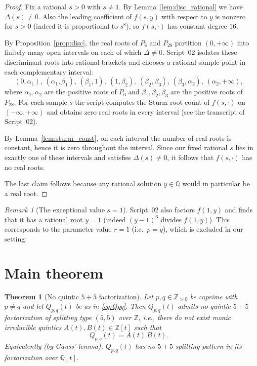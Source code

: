 \documentclass[12pt]{article}
\newtheorem{theorem}{Theorem}
\theoremstyle{remark}
\newtheorem{remark}{Remark}
\theoremstyle{definition}
\begin{document}
\begin{proof}
Fix a rational \(s>0\) with \(s\neq 1\).
By Lemma~\ref{lem:disc_rational} we have \(\Delta(s)\neq 0\).
Also the leading coefficient of \(f(s,y)\) with respect to \(y\) is nonzero for \(s>0\) (indeed it is proportional to \(s^8\)), so \(f(s,\cdot)\) has constant degree \(16\).

By Proposition~\ref{prop:disc}, the real roots of \(P_6\) and \(P_{28}\) partition \((0,+\infty)\) into finitely many open intervals on each of which \(\Delta\neq 0\).
Script~02 isolates these discriminant roots into rational brackets and chooses a rational sample point in each complementary interval:
\[
(0,\alpha_1),\ (\alpha_1,\beta_1),\ (\beta_1,1),\ (1,\beta_2),\ (\beta_2,\beta_3),\ (\beta_3,\alpha_2),\ (\alpha_2,+\infty),
\]
where \(\alpha_1,\alpha_2\) are the positive roots of \(P_6\) and \(\beta_1,\beta_2,\beta_3\) are the positive roots of \(P_{28}\).
For each sample \(s\) the script computes the Sturm root count of \(f(s,\cdot)\) on \((-\infty,+\infty)\) and obtains zero real roots in every interval (see the transcript of Script~02).

By Lemma~\ref{lem:sturm_const}, on each interval the number of real roots is constant, hence it is zero throughout the interval.
Since our fixed rational \(s\) lies in exactly one of these intervals and satisfies \(\Delta(s)\neq 0\), it follows that \(f(s,\cdot)\) has no real roots.

The last claim follows because any rational solution \(y\in\mathbb{Q}\) would in particular be a real root.
\end{proof}

\begin{remark}[The exceptional value $s=1$]
Script~02 also factors $f(1,y)$ and finds that it has a rational root $y=1$ (indeed $(y-1)^6$ divides $f(1,y)$).
This corresponds to the parameter value $r=1$ (i.e.\ $p=q$), which is excluded in our setting.
\end{remark}


\section{Main theorem}\label{sec:main}

\begin{theorem}[No quintic $5+5$ factorization]\label{thm:main}
Let $p,q\in\mathbb{Z}_{>0}$ be coprime with $p\neq q$ and let $Q_{p,q}(t)$ be as in \eqref{eq:Qpq}.
Then $Q_{p,q}(t)$ admits no quintic $5+5$ factorization of splitting type $(5,5)$ over\/ $\mathbb{Z}$, i.e., there do not exist monic irreducible quintics $A(t),B(t)\in\mathbb{Z}[t]$ such that
\[
Q_{p,q}(t)=A(t)\,B(t).
\]
Equivalently (by Gauss' lemma), $Q_{p,q}(t)$ has no $5+5$ splitting pattern in its factorization over $\mathbb{Q}[t]$.
\end{theorem}
\end{document}
